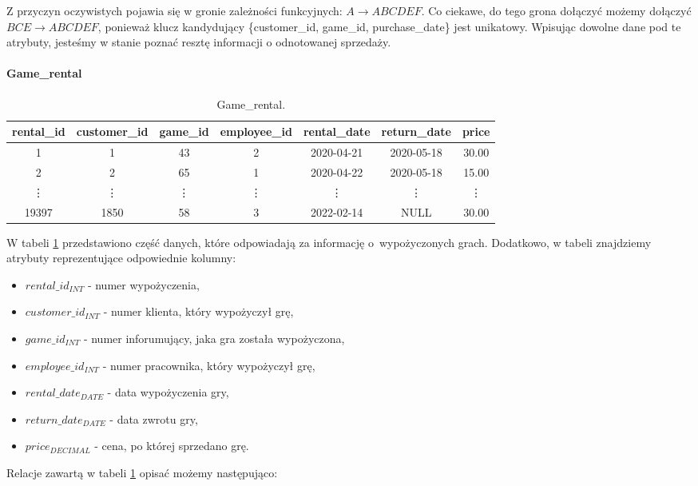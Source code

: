 \documentclass{article}
\theoremstyle{break}
\begin{document}
	Z przyczyn oczywistych pojawia się w gronie zależności funkcyjnych: $A \rightarrow ABCDEF$. Co ciekawe, do tego grona dołączyć możemy dołączyć $BCE\rightarrow ABCDEF$, ponieważ klucz kandydujący \{customer\_id, game\_id, purchase\_date\} jest unikatowy. Wpisując dowolne dane pod te atrybuty, jesteśmy w stanie poznać resztę informacji o odnotowanej sprzedaży. 
	
	
	\paragraph{Game\_rental}
	
	
	\begin{table}[!ht]
		\centering
		\begin{tabular}{|c|c|c|c|c|c|c|}
			\hline
			rental\_id & customer\_id & game\_id & employee\_id & rental\_date & return\_date & price \\ \hline
			1 & 1 & 43 & 2 & 2020-04-21 & 2020-05-18 & 30.00\\ \hline
			2 & 2 & 65 & 1 & 2020-04-22 & 2020-05-18 & 15.00\\ \hline
			\vdots & \vdots & \vdots & \vdots & \vdots & \vdots & \vdots \\ \hline
			19397 & 1850 & 58 & 3 & 2022-02-14 & NULL & 30.00 \\ \hline
		\end{tabular}
		\caption{Game\_rental.}
		\label{table:game_rental}
	\end{table}
	W tabeli \ref{table:game_rental} przedstawiono część danych, które odpowiadają za informację o~wypożyczonych grach. Dodatkowo, w tabeli znajdziemy atrybuty reprezentujące odpowiednie kolumny:
	\begin{itemize}
		\item $rental\_id_{INT}$ - numer wypożyczenia,
		\item $customer\_id_{INT}$ - numer klienta, który wypożyczył grę,
		\item $game\_id_{INT}$ - numer inforumujący, jaka gra została wypożyczona,
		\item $employee\_id_{INT}$ - numer pracownika, który wypożyczył grę,
		\item $rental\_date_{DATE}$ - data wypożyczenia gry,
		\item $return\_date_{DATE}$ - data zwrotu gry,
		\item $price_{DECIMAL}$ - cena, po której sprzedano grę.
	\end{itemize}
	Relacje zawartą w tabeli \ref{table:game_rental} opisać możemy następująco:
\end{document}
